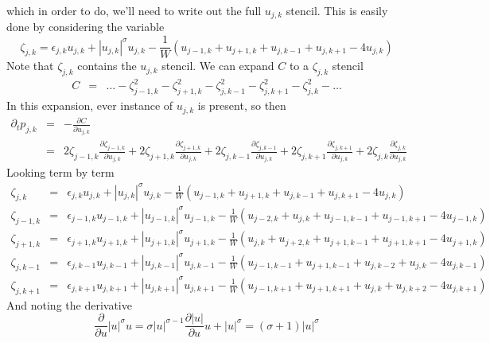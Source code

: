 \documentclass[12pt, a4paper, prl]{revtex4}
\newcommand{\abs}[1]{\left| #1 \right|}
\begin{document}
which in order to do, we'll need to write out the full $u_{j,k}$ stencil. This is easily done
by considering the variable 
\begin{equation*}
\zeta_{j,k} = 
  \epsilon_{j,k} u_{j,k} + \abs{u_{j,k}}^\sigma u_{j,k} - \frac{1}{W}\left( u_{j-1,k} + u_{j+1,k} + u_{j,k-1} + u_{j,k+1} - 4u_{j,k} \right) 
\end{equation*}
Note that $\zeta_{j,k}$ contains the $u_{j,k}$ stencil. We can expand $C$ to a $\zeta_{j,k}$ stencil
\begin{eqnarray*}
C &=& \ldots -  \zeta_{j-1,k}^2 - \zeta_{j+1,k}^2 - \zeta_{j,k-1}^2 - \zeta_{j,k+1}^2 - \zeta_{j,k}^2 - \ldots  
\end{eqnarray*}
In this expansion, ever instance of $u_{j,k}$ is present, so then
\begin{eqnarray*}
 \partial_t p_{j,k} &=& -\frac{\partial C}{\partial u_{j,k}} \\
 &=& 2 \zeta_{j-1,k} \frac{\partial\zeta_{j-1,k}}{\partial u_{j,k}} + 
 2\zeta_{j+1,k} \frac{\partial\zeta_{j+1,k}}{\partial u_{j,k}} +
 2 \zeta_{j,k-1}\frac{\partial\zeta_{j,k-1}}{\partial u_{j,k}} + 
 2 \zeta_{j,k+1}\frac{\partial\zeta_{j,k+1}}{\partial u_{j,k}} + 
 2 \zeta_{j,k}\frac{\partial\zeta_{j,k}}{\partial u_{j,k}}
\end{eqnarray*}
Looking term by term
\begin{eqnarray*}
\zeta_{j,k} &=& \epsilon_{j,k} u_{j,k} + \abs{u_{j,k}}^\sigma u_{j,k} - \frac{1}{W}\left( u_{j-1,k} + u_{j+1,k} + u_{j,k-1} + u_{j,k+1} - 4u_{j,k} \right) \\
\zeta_{j-1,k} &=& \epsilon_{j-1,k} u_{j-1,k} + \abs{u_{j-1,k}}^\sigma u_{j-1,k} - \frac{1}{W}\left( u_{j-2,k} + u_{j,k} + u_{j-1,k-1} + u_{j-1,k+1} - 4u_{j-1,k} \right) \\
\zeta_{j+1,k} &=& \epsilon_{j+1,k} u_{j+1,k} + \abs{u_{j+1,k}}^\sigma u_{j+1,k} - \frac{1}{W}\left( u_{j,k} + u_{j+2,k} + u_{j+1,k-1} + u_{j+1,k+1} - 4u_{j+1,k} \right) \\
\zeta_{j,k-1} &=& \epsilon_{j,k-1} u_{j,k-1} + \abs{u_{j,k-1}}^\sigma u_{j,k-1} - \frac{1}{W}\left( u_{j-1,k-1} + u_{j+1,k-1} + u_{j,k-2} + u_{j,k} - 4u_{j,k-1} \right) \\
\zeta_{j,k+1} &=& \epsilon_{j,k+1} u_{j,k+1} + \abs{u_{j,k+1}}^\sigma u_{j,k+1} - \frac{1}{W}\left( u_{j-1,k+1} + u_{j+1,k+1} + u_{j,k} + u_{j,k+2} - 4u_{j,k+1} \right) 
\end{eqnarray*}
And noting the derivative
\begin{equation*}
\frac{\partial}{\partial u} \abs{u}^\sigma u = \sigma \abs{u}^{\sigma -1} \frac{\partial \abs{u}}{\partial u} u + \abs{u}^\sigma  = \left(\sigma + 1\right) \abs{u}^\sigma
\end{equation*}
\end{document}
